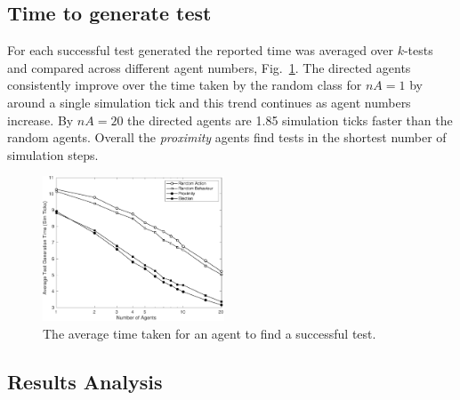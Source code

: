 \documentclass[letterpaper, 10 pt, journal, twoside]{IEEEtran}
\begin{document}
\subsection{Time to generate test}
For each successful test generated the reported time was averaged over $k$-tests and compared across different agent numbers, Fig.~\ref{Time}. 
%
The directed agents consistently improve over the time taken by the random class for $nA=1$ by around a single simulation tick and this trend continues as agent numbers increase. By $nA=20$ the directed agents are 1.85 simulation ticks faster than the random agents. Overall the \textit{proximity} agents find tests in the shortest number of simulation steps.

\begin{figure}[!t]
	\centering
\includegraphics[width=0.48\textwidth]{Time.pdf}
	\caption{The average time taken for an agent to find a successful test.}
	\label{Time}
\end{figure}




\subsection{Results Analysis}
\end{document}
